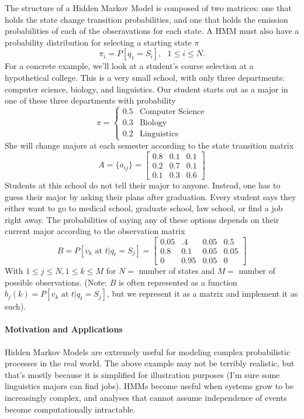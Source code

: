 The structure of a Hidden Markov Model is composed of two matrices: one that holds the state change transition probabilities, and one that holds the emission probabilities of each of the obseravations for each state. A HMM must also have a probability distribution for selecting a starting state $\pi$ \[
  \pi_i = P[q_1 = S_i], \ \ \ 1 \leq i \leq N.
\] For a concrete example, we'll look at a student's course selection at a hypothetical college. This is a very small school, with only three departments: computer science, biology, and linguistics. Our student starts out as a major in one of these three departments with probability \[
  \pi = \begin{cases} 
            0.5 & \text{Computer Science}\\
            0.3 & \text{Biology}\\
            0.2 & \text{Linguistics}
          \end{cases}
\] She will change majors at each semester according to the state transition matrix \[
  A = \{a_{ij}\} = \begin{bmatrix}
                      0.8 & 0.1 & 0.1\\
                      0.2 & 0.7 & 0.1\\
                      0.1 & 0.3 & 0.6
                    \end{bmatrix}
\] Students at this school do not tell their major to anyone. Instead, one has to guess their major by asking their plans after graduation. Every student says they either want to go to medical school, graduate school, law school, or find a job right away. The probabilities of saying any of these options depends on their current major according to the observation matrix \[
  B = P[v_k \text{ at } t|q_t = S_j] = \begin{bmatrix}
                                        0.05 & .4 & 0.05 & 0.5\\
                                        0.8 & 0.1 & 0.05 & 0.05\\
                                        0 & 0.95 & 0.05 & 0
                                      \end{bmatrix}
\] With $1 \leq j \leq N, 1 \leq k \leq M$ for $N =$ number of states and $M =$ number of possible observations. (Note: $B$ is often represented as a function $b_j(k) = P[v_k \text{ at } t|q_t = S_j]$, but we represent it as a matrix and implement it as such). 



\paragraph{Motivation and Applications}
Hidden Markov Models are extremely useful for modeling complex probabilistic processes in the real world. The above example may not be terribly realistic, but that's mostly because it is simplified for illustration purposes (I'm sure some linguistics majors can find jobs). HMMs become useful when systems grow to be increasingly complex, and analyses that cannot assume independence of events become computationally intractable. 

